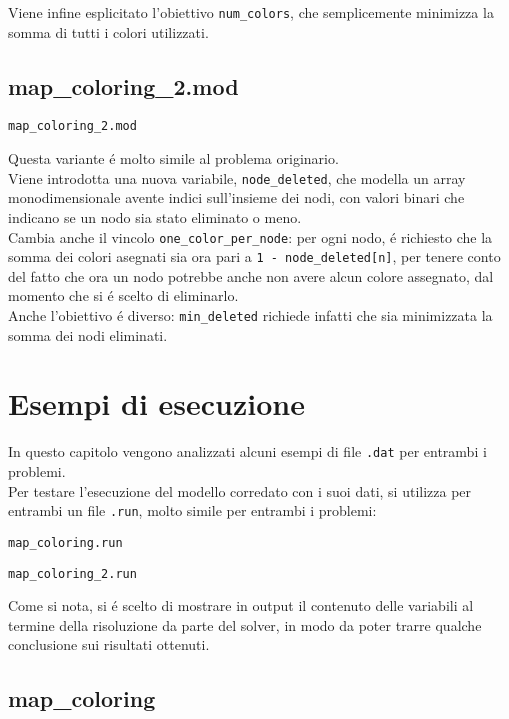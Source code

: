 \documentclass{article}
\begin{document}
Viene infine esplicitato l'obiettivo \texttt{num\_colors}, che semplicemente minimizza la somma di tutti i colori utilizzati.\\
\pagebreak

\subsection{map\_coloring\_2.mod}
\texttt{map\_coloring\_2.mod}


Questa variante \'e molto simile al problema originario.\\
Viene introdotta una nuova variabile, \texttt{node\_deleted}, che modella un array monodimensionale avente indici sull'insieme dei nodi, con valori binari che indicano se un nodo sia stato eliminato o meno.\\

Cambia anche il vincolo \texttt{one\_color\_per\_node}: per ogni nodo, \'e richiesto che la somma dei colori asegnati sia ora pari a \texttt{1 - node\_deleted[n]}, per tenere conto del fatto che ora un nodo potrebbe anche non avere alcun colore assegnato, dal momento che si \'e scelto di eliminarlo.\\

Anche l'obiettivo \'e diverso: \texttt{min\_deleted} richiede infatti che sia minimizzata la somma dei nodi eliminati.\\
\pagebreak

\section{Esempi di esecuzione}
In questo capitolo vengono analizzati alcuni esempi di file \texttt{.dat} per entrambi i problemi.\\
Per testare l'esecuzione del modello corredato con i suoi dati, si utilizza per entrambi un file \texttt{.run}, molto simile per entrambi i problemi:

\texttt{map\_coloring.run}


\texttt{map\_coloring\_2.run}


Come si nota, si \'e scelto di mostrare in output il contenuto delle variabili al termine della risoluzione da parte del solver, in modo da poter trarre qualche conclusione sui risultati ottenuti.\\

\subsection{map\_coloring}
\end{document}
